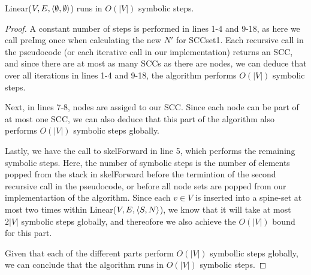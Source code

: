 \documentclass[../master/master.tex]{subfiles}
\begin{document}
\begin{theorem}\label{linear} Linear($V, E, \langle \emptyset, \emptyset\rangle$) runs in $O(|V|)$ symbolic steps.
\end{theorem}
\begin{proof} A constant number of steps is performed in lines 1-4 and 9-18, as here we call preImg once when calculating the new $N'$ for SCCset1. Each recursive call in the pseudocode (or each iterative call in our implementation) returns an SCC, and since there are at most as many SCCs as there are nodes, we can deduce that over all iterations in lines 1-4 and 9-18, the algorithm performs $O(|V|)$ symbolic steps.

Next, in lines 7-8, nodes are assiged to our SCC. Since each node can be part of at most one SCC, we can also deduce that this part of the algorithm also performs $O(|V|)$ symbolic steps globally.

Lastly, we have the call to skelForward in line 5, which performs the remaining symbolic steps. Here, the number of symbolic steps is the number of elements popped from the stack in skelForward before the termintion of the second recursive call in the pseudocode, or before all node sets are popped from our implementartion of the algorithm. Since each $v\in V$ is inserted into a spine-set at most two times within Linear($V, E, \langle S, N\rangle$)\cite{linear}, we know that it will take at most $2|V|$ symbolic steps globally, and thereofore we also achieve the $O(|V|)$ bound for this part.

Given that each of the different parts perform $O(|V|)$ symbollic steps globally, we can conclude that the algorithm runs in $O(|V|)$ symbolic steps.
\end{proof}
\end{document}
